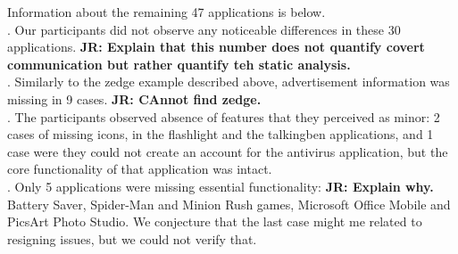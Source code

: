 
Information about the remaining 47 applications is below.
\\
{}.
Our participants did not observe any noticeable differences in these 30 applications.
{\bf JR: Explain that this number does not quantify covert communication but rather quantify teh static analysis.}
\\
. 
Similarly to the zedge example described above, advertisement information was missing in 9 cases. 
{\bf JR: CAnnot find zedge.}
\\
. 
The participants observed absence of features that they perceived as  minor: 2 cases of missing icons, in the flashlight and the talkingben applications, and 1 case were they could not create an account for the antivirus application, but the core functionality of that application was intact. 
\\
.
Only 5 applications were missing essential functionality: %
{\bf JR: Explain why.}
Battery Saver, Spider-Man and Minion Rush games, Microsoft Office Mobile and PicsArt Photo Studio. We conjecture that the last case might me related to resigning issues, but we could not verify that. 

